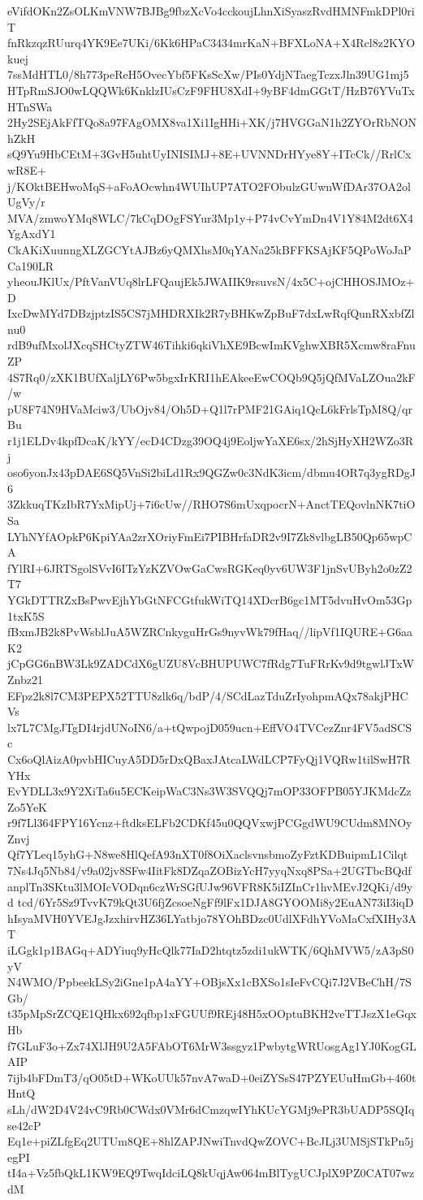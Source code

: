 eVifdOKn2ZsOLKmVNW7BJBg9fbzXcVo4cckoujLhnXiSyaszRvdHMNFmkDPl0riT
fnRkzqzRUurq4YK9Ee7UKi/6Kk6HPaC3434mrKaN+BFXLoNA+X4Rcl8z2KYOkuej
7ssMdHTL0/8h773peReH5OvecYbf5FKsScXw/PIs0YdjNTaegTczxJln39UG1mj5
HTpRmSJO0wLQQWk6KnklzIUsCzF9FHU8XdI+9yBF4dmGGtT/HzB76YVuTxHTnSWa
2Hy2SEjAkFfTQo8a97FAgOMX8va1Xi1IgHHi+XK/j7HVGGaN1h2ZYOrRbNONhZkH
sQ9Yu9HbCEtM+3GvH5uhtUyINISIMJ+8E+UVNNDrHYye8Y+ITcCk//RrlCxwR8E+
j/KOktBEHwoMqS+aFoAOcwhn4WUIhUP7ATO2FObulzGUwnWfDAr37OA2olUgVy/r
MVA/zmwoYMq8WLC/7kCqDOgFSYur3Mp1y+P74vCvYmDn4V1Y84M2dt6X4YgAxdY1
CkAKiXuunngXLZGCYtAJBz6yQMXhsM0qYANa25kBFFKSAjKF5QPoWoJaPCa190LR
yheouJKlUx/PftVanVUq8lrLFQaujEk5JWAIIK9rsuvsN/4x5C+ojCHHOSJMOz+D
IxcDwMYd7DBzjptzIS5CS7jMHDRXIk2R7yBHKwZpBuF7dxLwRqfQunRXxbfZlnu0
rdB9ufMxolJXcqSHCtyZTW46Tihki6qkiVhXE9BcwImKVghwXBR5Xcmw8raFnuZP
4S7Rq0/zXK1BUfXaljLY6Pw5bgxIrKRI1hEAkeeEwCOQb9Q5jQfMVaLZOua2kF/w
pU8F74N9HVaMciw3/UbOjv84/Oh5D+Q1l7rPMF21GAiq1QcL6kFrlsTpM8Q/qrBu
r1j1ELDv4kpfDcaK/kYY/ecD4CDzg39OQ4j9EoljwYaXE6sx/2hSjHyXH2WZo3Rj
oso6yonJx43pDAE6SQ5VnSi2biLd1Rx9QGZw0c3NdK3icm/dbmu4OR7q3ygRDgJ6
3ZkkuqTKzIbR7YxMipUj+7i6cUw//RHO7S6mUxqpocrN+AnctTEQovlnNK7tiOSa
LYhNYfAOpkP6KpiYAa2zrXOriyFmEi7PIBHrfaDR2v9I7Zk8vlbgLB50Qp65wpCA
fYlRI+6JRTSgolSVvI6ITzYzKZVOwGaCwsRGKeq0yv6UW3F1jnSvUByh2o0zZ2T7
YGkDTTRZxBsPwvEjhYbGtNFCGtfukWiTQ14XDcrB6gc1MT5dvuHvOm53Gp1txK5S
fBxmJB2k8PvWsblJuA5WZRCnkyguHrGs9nyvWk79fHaq//lipVf1IQURE+G6aaK2
jCpGG6nBW3Lk9ZADCdX6gUZU8VcBHUPUWC7fRdg7TuFRrKv9d9tgwlJTxWZnbz21
EFpz2k8l7CM3PEPX52TTU8zlk6q/bdP/4/SCdLazTduZrIyohpmAQx78akjPHCVs
lx7L7CMgJTgDI4rjdUNoIN6/a+tQwpojD059ucn+EffVO4TVCezZnr4FV5adSCSc
Cx6oQlAizA0pvbHICuyA5DD5rDxQBaxJAtcaLWdLCP7FyQj1VQRw1tilSwH7RYHx
EvYDLL3x9Y2XiTa6u5ECKeipWaC3Ns3W3SVQQj7mOP33OFPB05YJKMdcZzZo5YeK
r9f7Ll364FPY16Ycnz+ftdksELFb2CDKf45u0QQVxwjPCGgdWU9CUdm8MNOyZnvj
Qf7YLeq15yhG+N8we8HlQefA93nXT0f8OiXaclsvnsbmoZyFztKDBuipmL1Cilqt
7Ns4Jq5Nb84/v9a02jv8SFw4IitFk8DZqaZOBizYcH7yyqNxq8PSa+2UGTbcBQdf
anplTn3SKtu3lMOIcVODqn6czWrSGfUJw96VFR8K5iIZInCr1hvMEvJ2QKi/d9yd
tcd/6Yr5Sz9TvvK79kQt3U6fjZcsoeNgFf9lFx1DJA8GYOOMi8y2EuAN73iI3iqD
hIsyaMVH0YVEJgJzxhirvHZ36LYatbjo78YOhBDzc0UdlXFdhYVoMaCxfXIHy3AT
iLGgk1p1BAGq+ADYiuq9yHcQlk77IaD2htqtz5zdi1ukWTK/6QhMVW5/zA3pS0yV
N4WMO/PpbeekLSy2iGne1pA4aYY+OBjsXx1cBXSo1sIeFvCQi7J2VBeChH/7SGb/
t35pMpSrZCQE1QHkx692qfbp1xFGUUf9REj48H5xOOptuBKH2veTTJszX1eGqxHb
f7GLuF3o+Zx74XlJH9U2A5FAbOT6MrW3ssgyz1PwbytgWRUosgAg1YJ0KogGLAIP
7ijb4bFDmT3/qO05tD+WKoUUk57nvA7waD+0eiZYSsS47PZYEUuHmGb+460tHntQ
sLh/dW2D4V24vC9Rb0CWdx0VMr6dCmzqwIYhKUcYGMj9ePR3bUADP5SQIqse42cP
Eq1e+piZLfgEq2UTUm8QE+8hlZAPJNwiTnvdQwZOVC+BcJLj3UMSjSTkPn5jegPI
tI4a+Vz5fbQkL1KW9EQ9TwqIdciLQ8kUqjAw064mBlTygUCJplX9PZ0CAT07wzdM
